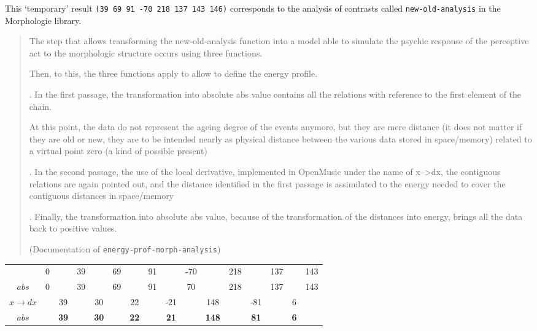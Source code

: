 \bigskip 

This `temporary' result \texttt{(39 69 91 -70 218 137 143 146)} corresponds to the analysis of contrasts called \texttt{new-old-analysis} in the Morphologie library.

\begin{quotation} 
\begin{slshape} 
\noindent The step that allows transforming the new-old-analysis function into a model able to simulate the psychic response of the perceptive act to the morphologic structure occurs using three functions.

\noindent Then, to this, the three functions apply to allow to define the energy profile.

. In the first passage, the transformation into absolute abs value contains all the relations with reference to the first element of the chain.

\noindent At this point, the data do not represent the ageing degree of the events anymore, but they are mere distance (it does not matter if they are old or new, they are to be intended nearly as physical distance between the various data stored in space/memory) related to a virtual point zero (a kind of possible present)

. In the second passage, the use of the local derivative, implemented in OpenMusic under the name of x–>dx, the contiguous relations are again pointed out, and the distance identified in the first passage is assimilated to the energy needed to cover the contiguous distances in space/memory

. Finally, the transformation into absolute abs value, because of the transformation of the distances into energy, brings all the data back to positive values.
\end{slshape} 

\noindent (Documentation of \texttt{energy-prof-morph-analysis})
\end{quotation} 

\bigskip

\noindent
\begin{adjustbox}{center}
\begin{tabular}{cccccccccccccccc}
 &	0 &	 &	39 & &	69 & &	91 & &	-70 & &	218 & &	137 & &	143 \\
\cellcolor {gray!20} $abs$ & 0 & &	39 & & 69 & & 91 & & 70 & &	218 & &	137 & &	143 \\
\cellcolor {gray!20} $x \rightarrow dx$ & & 39 & &	30 & & 22 & & -21 & & 148 & & -81 & & 6 & \\
\cellcolor {gray!20} $abs$ &\cellcolor {gray!20} &\cellcolor {gray!20} \bf 39 &\cellcolor {gray!20} &\cellcolor {gray!20} \bf 30 &\cellcolor {gray!20} &\cellcolor {gray!20} \bf 22 &\cellcolor {gray!20} &\cellcolor {gray!20} \bf 21 &\cellcolor {gray!20} &\cellcolor {gray!20} \bf 148 &\cellcolor {gray!20} &\cellcolor {gray!20} \bf 81 &\cellcolor {gray!20} &\cellcolor {gray!20} \bf 6 &\cellcolor {gray!20} \\
\end{tabular}
\end{adjustbox}

